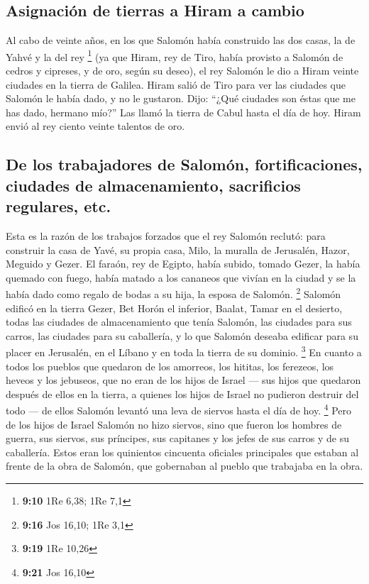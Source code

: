 \hypertarget{asignaciuxf3n-de-tierras-a-hiram-a-cambio}{%
\subsection{Asignación de tierras a Hiram a
cambio}\label{asignaciuxf3n-de-tierras-a-hiram-a-cambio}}

 Al cabo de veinte años, en los que Salomón había
construido las dos casas, la de Yahvé y la del rey \footnote{\textbf{9:10}
  1Re 6,38; 1Re 7,1}  (ya que Hiram, rey de Tiro, había
provisto a Salomón de cedros y cipreses, y de oro, según su deseo), el
rey Salomón le dio a Hiram veinte ciudades en la tierra de Galilea.
 Hiram salió de Tiro para ver las ciudades que Salomón le
había dado, y no le gustaron.  Dijo: ``¿Qué ciudades son
éstas que me has dado, hermano mío?'' Las llamó la tierra de Cabul hasta
el día de hoy.  Hiram envió al rey ciento veinte talentos
de oro.

\hypertarget{de-los-trabajadores-de-salomuxf3n-fortificaciones-ciudades-de-almacenamiento-sacrificios-regulares-etc.}{%
\subsection{De los trabajadores de Salomón, fortificaciones, ciudades de
almacenamiento, sacrificios regulares,
etc.}\label{de-los-trabajadores-de-salomuxf3n-fortificaciones-ciudades-de-almacenamiento-sacrificios-regulares-etc.}}

 Esta es la razón de los trabajos forzados que el rey
Salomón reclutó: para construir la casa de Yavé, su propia casa, Milo,
la muralla de Jerusalén, Hazor, Meguido y Gezer.  El
faraón, rey de Egipto, había subido, tomado Gezer, la había quemado con
fuego, había matado a los cananeos que vivían en la ciudad y se la había
dado como regalo de bodas a su hija, la esposa de Salomón. \footnote{\textbf{9:16}
  Jos 16,10; 1Re 3,1}  Salomón edificó en la tierra
Gezer, Bet Horón el inferior,  Baalat, Tamar en el
desierto,  todas las ciudades de almacenamiento que tenía
Salomón, las ciudades para sus carros, las ciudades para su caballería,
y lo que Salomón deseaba edificar para su placer en Jerusalén, en el
Líbano y en toda la tierra de su dominio. \footnote{\textbf{9:19} 1Re
  10,26}  En cuanto a todos los pueblos que quedaron de
los amorreos, los hititas, los ferezeos, los heveos y los jebuseos, que
no eran de los hijos de Israel ---  sus hijos que
quedaron después de ellos en la tierra, a quienes los hijos de Israel no
pudieron destruir del todo --- de ellos Salomón levantó una leva de
siervos hasta el día de hoy. \footnote{\textbf{9:21} Jos 16,10}
 Pero de los hijos de Israel Salomón no hizo siervos,
sino que fueron los hombres de guerra, sus siervos, sus príncipes, sus
capitanes y los jefes de sus carros y de su caballería. 
Estos eran los quinientos cincuenta oficiales principales que estaban al
frente de la obra de Salomón, que gobernaban al pueblo que trabajaba en
la obra.

